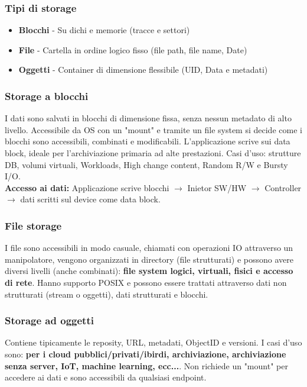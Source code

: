 \documentclass[8pt,a4paper]{extarticle}
\begin{document}
\begin{multicols*}{4}
	 	\subsubsection{Tipi di storage}
	 		\begin{itemize}
	 			\item \textbf{Blocchi} - Su dichi e memorie (tracce e settori)
	 			\item \textbf{File} - Cartella in ordine logico fisso (file path, file name, Date)
	 			\item \textbf{Oggetti}  - Container di dimensione flessibile (UID, Data e metadati)
	 		\end{itemize}
	 		\subsubsection{Storage a blocchi}
	 		I dati sono salvati in blocchi di dimensione fissa, senza nessun metadato di alto livello. Accessibile da OS con un "mount" e tramite un file system si decide come i blocchi sono accessibili, combinati e modificabili. L'applicazione scrive sui data block, ideale per l'archiviazione primaria ad alte prestazioni. Casi d'uso: strutture DB, volumi virtuali, Workloads, High change content, Random R/W e Bursty I/O.\\
	 		\textbf{Accesso ai dati:} Applicazione scrive blocchi $\to$ Inietor SW/HW $\to$ Controller $\to$ dati scritti sul device come data block.

	 		\subsubsection{File storage}
	 		I file sono accessibili in modo casuale, chiamati con operazioni IO attraverso un manipolatore, vengono organizzati in directory (file strutturati) e possono avere diversi livelli (anche combinati): \textbf{file system logici, virtuali, fisici e accesso di rete}. Hanno supporto POSIX e possono essere trattati attraverso dati non strutturati (stream o oggetti), dati strutturati e blocchi.
	 		
	 		\subsubsection{Storage ad oggetti}
	 		Contiene tipicamente le reposity, URL, metadati, ObjectID e versioni. I casi d'uso sono: \textbf{per i cloud pubblici/privati/ibirdi, archiviazione, archiviazione senza server, IoT, machine learning,  ecc...}. Non richiede un "mount" per accedere ai dati e sono accessibili da qualsiasi endpoint.

\end{multicols*}
\end{document}
